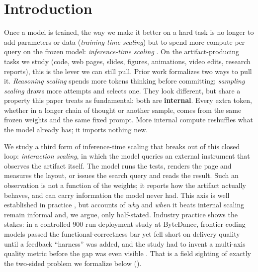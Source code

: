 \section{Introduction}
\label{sec:intro}

Once a model is trained, the way we make it better on a hard task is no longer to add parameters or data (\emph{training-time scaling}) but to spend more compute per query on the frozen model: \emph{inference-time scaling} \citep{openai2024o1,snell2024scaling}. On the artifact-producing tasks we study (code, web pages, slides, figures, animations, video edits, research reports), this is the lever we can still pull. Prior work formalizes two ways to pull it. \emph{Reasoning scaling} \citep{wei2022chain,yao2023tree,deepseek2025r1,snell2024scaling} spends more tokens thinking before committing; \emph{sampling scaling} \citep{wang2023selfconsistency,brown2024large} draws more attempts and selects one. They look different, but share a property this paper treats as fundamental: both are \textbf{internal}. Every extra token, whether in a longer chain of thought or another sample, comes from the same frozen weights and the same fixed prompt. More internal compute reshuffles what the model already has; it imports nothing new.

We study a third form of inference-time scaling that breaks out of this closed loop: \emph{interaction scaling}, in which the model queries an external instrument that observes the artifact itself. The model runs the tests, renders the page and measures the layout, or issues the search query and reads the result. Such an observation is not a function of the weights; it reports how the artifact actually behaves, and can carry information the model never had. This axis is well established in practice \citep{shinn2023reflexion,yao2023react,gou2024critic,shen2025thinking}, but accounts of \emph{why} and \emph{when} it beats internal scaling remain informal and, we argue, only half-stated. Industry practice shows the stakes: in a controlled $900$-run deployment study at ByteDance, frontier coding models passed the functional-correctness bar yet fell short on delivery quality until a feedback ``harness'' was added, and the study had to invent a multi-axis quality metric before the gap was even visible \citep{hong2026aicoding}. That is a field sighting of exactly the two-sided problem we formalize below ().

